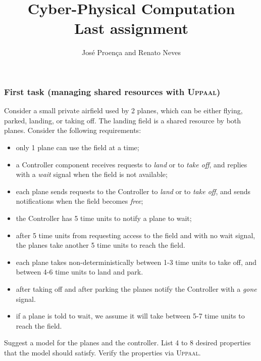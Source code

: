 \documentclass[11pt]{article}
\date{}
\theoremstyle{myplain}
\theoremstyle{definition} %
\begin{document}
 
 
\title{Cyber-Physical Computation
\\ {\small Last assignment}}
\author{José Proença and Renato Neves}
 
\maketitle

\subsubsection*{First task (managing shared resources with \textsc{Uppaal})}
Consider a small private airfield used by 2 planes, which can be either flying,
parked, landing, or taking off. The landing field is a shared resource by both
planes. Consider the following requirements:
\begin{itemize}
  \setlength\itemsep{0.3mm}
  \item only 1 plane can use the field at a time;
  \item a Controller component receives requests to \emph{land} or to \emph{take off}, and replies with a \emph{wait} signal when the field is not available;
  \item each plane sends requests to the Controller to \emph{land} or to \emph{take off}, and sends notifications when the field becomes \emph{free};
  \item the Controller has 5 time units to notify a plane to wait;
  \item after 5 time units from requesting access to the field and with no wait signal, the planes take another 5 time units to reach the field.
  \item each plane takes non-deterministically between 1-3 time units to take off, and between 4-6 time units to land and park.
  \item after taking off and after parking the planes notify the Controller with a \emph{gone} signal.
  \item if a plane is told to wait, we assume it will take between 5-7 time units to reach the field.
\end{itemize}

\noindent
Suggest a model for the planes and the controller. List 4 to 8 desired
properties that the model should satisfy. Verify the properties via
\textsc{Uppaal}.
\end{document}

